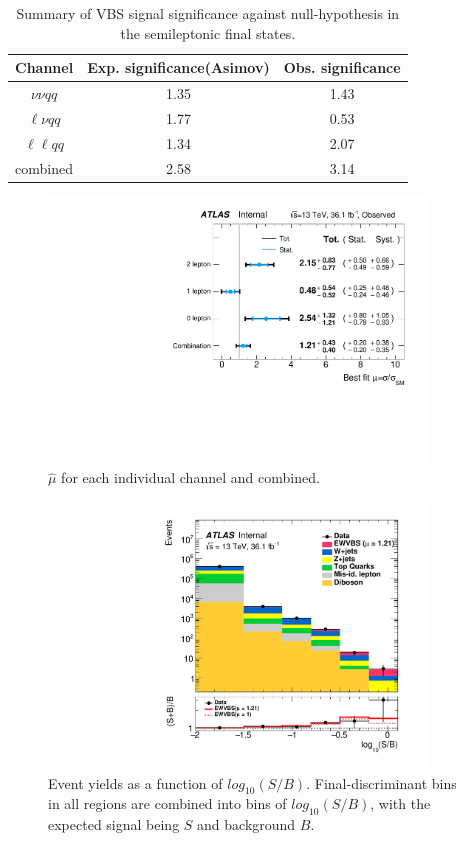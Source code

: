 \begin{table}[htb] 
	\centering
	\begin{tabular}{ccc}
		\hline
		Channel  & Exp. significance(Asimov) & Obs. significance  \\ 
		\hline
		$\nu\nu qq$ & 1.35 & 1.43 \\
		$\ell\nu qq$ & 1.77 & 0.53 \\
		$\ell\ell qq$ & 1.34 & 2.07 \\
		combined & 2.58  & 3.14 \\
		\hline 
	\end{tabular}
	\caption{Summary of VBS signal significance against null-hypothesis in the semileptonic final states.}
	\label{tab:significance_sbfit_obs}  
\end{table}
\begin{figure}[!h]
	\begin{centering}
		\includegraphics[width=10cm]{Chapter5/Muhat_VBS_channels_obs.pdf} 
		\caption{$\hat{\mu}$ for each individual channel and combined.}
		\label{fig:fit_mu_VBS_obs}  
	\end{centering}
\end{figure}
\begin{figure}[!h]
	\begin{centering}
		\includegraphics[width=10cm]{Chapter5/Global_SoverB_2016.pdf} 
		\caption{Event yields as a function of $log_{10}(S/B)$. Final-discriminant bins in all regions are combined into bins of
			$log_{10}(S/B)$, with the expected signal being $S$ and background $B$.}
		\label{fig:SoBplot_obs}  
	\end{centering}
\end{figure}
